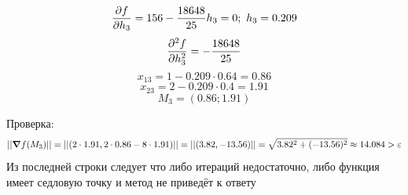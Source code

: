 \documentclass{article}
\begin{document}
\[\pdv{f}{h_3} = 156 - \frac{18648}{25}h_3= 0;\ h_3 = 0.209\]
\[\pdv{^2f}{h_3^2} = -\frac{18648}{25}\]
\[x_{13} = 1 - 0.209\cdot 0.64  = 0.86\]
\[x_{23} = 2 - 0.209\cdot 0.4 = 1.91\]
\[M_3 = (0.86; 1.91)\]

Проверка:
\[||\grad f(M_3)|| = ||(2\cdot1.91,2\cdot0.86-8\cdot1.91)|| = ||(3.82,-13.56)|| = \sqrt{3.82^2 + (-13.56)^2} \approx 14.084 > \varepsilon\]
Из последней строки следует что либо итераций недостаточно, либо функция имеет седловую точку и метод не приведёт к ответу
\end{document}
